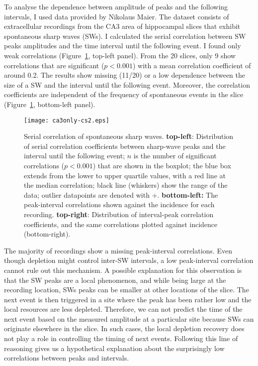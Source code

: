     To analyse the dependence between amplitude of peaks and the following
    intervals, I used data provided by Nikolaus Maier. The dataset consists of
    extracellular recordings from the CA3 area of hippocampal slices that
    exhibit spontaneous sharp waves (SWs). I calculated the serial correlation
    between SW peaks amplitudes and the time interval until the following
    event. I found only weak correlations (Figure~\ref{fig:ca3only_SCsumm},
    top-left panel). From the 20 slices, only 9 show correlations that are
    significant ($p<0.001$) with a mean correlation coefficient of around 0.2.
    The results show missing (11/20) or a low dependence between the size of a
    SW and the interval until the following event. Moreover, the correlation
    coefficients are independent of the frequency of spontaneous events in the
    slice (Figure~\ref{fig:ca3only_SCsumm}, bottom-left panel).

    \begin{figure}
      \texttt{[image: ca3only-cs2.eps]}
      \caption{
        Serial correlation of spontaneous sharp waves. \textbf{top-left}: Distribution
        of serial correlation coefficients between sharp-wave peaks and the
        interval until the following event; $n$ is the number of significant
        correlations ($p<0.001$) that are shown in the boxplot; the blue box
        extends from the lower to upper quartile values, with a red line at the
        median correlation; black line (whiskers) show the range of the data;
        outlier datapoints are denoted with $+$. \textbf{bottom-left:} The
        peak-interval correlations shown against the incidence for each
        recording. \textbf{top-right}: Distribution of interval-peak correlation
        coefficients, and the same correlations plotted against incidence
        (bottom-right).
             }
    \label{fig:ca3only_SCsumm}
    \end{figure}

    The majority of recordings show a missing peak-interval correlations. Even
    though depletion might control inter-SW intervals, a low peak-interval
    correlation cannot rule out this mechanism. A possible explanation for this
    observation is that the SW peaks are a local phenomenon, and while being
    large at the recording location, SWs peaks can be smaller at other
    locations of the slice. The next event is then triggered in a site where
    the peak has been rather low and the local resources are less depleted.
    Therefore, we can not predict the time of the next event based on the
    measured amplitude at a particular site because SWs can originate elsewhere
    in the slice. In such cases, the local depletion recovery does not play a
    role in controlling the timing of next events. Following this line of
    reasoning gives us a hypothetical explanation about the surprisingly low
    correlations between peaks and intervals.

